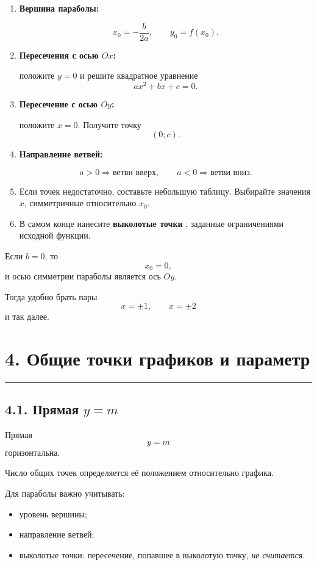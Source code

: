\documentclass[a4paper,12pt]{article}
\newcommand{\sectionrule}{%
    \par
    \vspace{-0.4em}
    {\color{accent}\rule{\linewidth}{0.5pt}}
    \vspace{0.4em}
}
\newcommand{\key}[1]{%
    \textcolor{darkaccent}{\textbf{#1}}
}
\begin{document}
\begin{enumerate}

\item
\key{Вершина параболы:}
\[
x_0=-\frac{b}{2a},
\qquad
y_0=f(x_0).
\]

\item
\key{Пересечения с осью $Ox$:}
положите $y=0$ и решите квадратное уравнение
\[
ax^2+bx+c=0.
\]

\item
\key{Пересечение с осью $Oy$:}
положите $x=0$. Получите точку
\[
(0;c).
\]

\item
\key{Направление ветвей:}
\[
a>0
\Rightarrow
\text{ветви вверх},
\qquad
a<0
\Rightarrow
\text{ветви вниз}.
\]

\item
Если точек недостаточно, составьте небольшую таблицу. Выбирайте значения $x$, симметричные относительно $x_0$.

\item
В самом конце нанесите \key{выколотые точки}, заданные ограничениями исходной функции.

\end{enumerate}

Если $b=0$, то
\[
x_0=0,
\]
и осью симметрии параболы является ось $Oy$.

Тогда удобно брать пары
\[
x=\pm1,
\qquad
x=\pm2
\]
и так далее.

\section*{4. Общие точки графиков и параметр}
\sectionrule

\subsection*{4.1. Прямая $y=m$}

Прямая
\[
y=m
\]
горизонтальна.

Число общих точек определяется её положением относительно графика.

Для параболы важно учитывать:

\begin{itemize}
\item уровень вершины;
\item направление ветвей;
\item выколотые точки: пересечение, попавшее в выколотую точку, \emph{не считается}.
\end{itemize}
\end{document}
